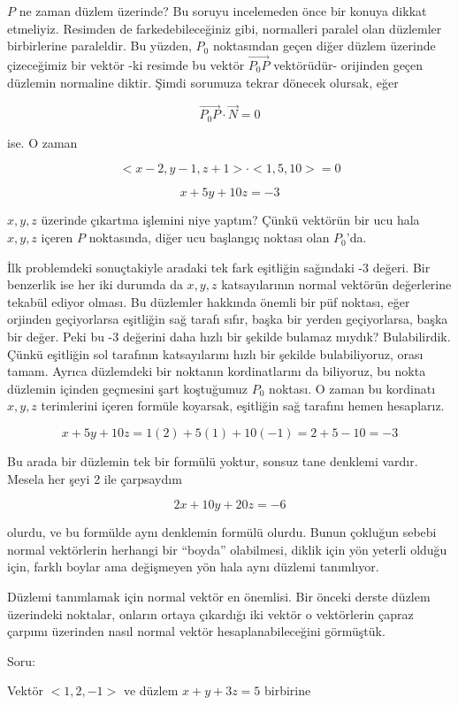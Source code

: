 \documentclass[12pt,fleqn]{article}\usepackage{../../common}
\begin{document}
$P$ ne zaman düzlem üzerinde? Bu soruyu incelemeden önce bir konuya dikkat
etmeliyiz. Resimden de farkedebileceğiniz gibi, normalleri paralel olan
düzlemler birbirlerine paraleldir. Bu yüzden, $P_0$ noktasından geçen diğer
düzlem üzerinde çizeceğimiz bir vektör -ki resimde bu vektör $\vec{P_0P}$
vektörüdür- orijinden geçen düzlemin normaline diktir. Şimdi sorumuza tekrar
dönecek olursak, eğer

$$ \vec{P_0P} \cdot \vec{N} = 0 $$

ise. O zaman 

$$ < x-2, y-1, z+1 > \cdot < 1,5,10 > = 0 $$

$$ x+5y + 10z = -3 $$

$x,y,z$ üzerinde çıkartma işlemini niye yaptım? Çünkü vektörün bir ucu hala
$x,y,z$ içeren $P$ noktasında, diğer ucu başlangıç noktası olan $P_0$'da.

İlk problemdeki sonuçtakiyle aradaki tek fark eşitliğin sağındaki -3 değeri. Bir
benzerlik ise her iki durumda da $x,y,z$ katsayılarının normal vektörün
değerlerine tekabül ediyor olması. Bu düzlemler hakkında önemli bir püf noktası,
eğer orjinden geçiyorlarsa eşitliğin sağ tarafı sıfır, başka bir yerden
geçiyorlarsa, başka bir değer. Peki bu -3 değerini daha hızlı bir şekilde
bulamaz mıydık? Bulabilirdik. Çünkü eşitliğin sol tarafının katsayılarını hızlı
bir şekilde bulabiliyoruz, orası tamam. Ayrıca düzlemdeki bir noktanın
kordinatlarını da biliyoruz, bu nokta düzlemin içinden geçmesini şart koştuğumuz
$P_0$ noktası. O zaman bu kordinatı $x,y,z$ terimlerini içeren formüle koyarsak,
eşitliğin sağ tarafını hemen hesaplarız.

$$ x+5y + 10z = 1(2) + 5(1) + 10(-1) = 2 + 5 -10 = -3$$

Bu arada bir düzlemin tek bir formülü yoktur, sonsuz tane denklemi
vardır. Mesela her şeyi 2 ile çarpsaydım

$$ 2x+10y+20z = -6 $$

olurdu, ve bu formülde aynı denklemin formülü olurdu. Bunun çokluğun sebebi
normal vektörlerin herhangi bir ``boyda'' olabilmesi, diklik için yön yeterli
olduğu için, farklı boylar ama değişmeyen yön hala aynı düzlemi tanımlıyor.

Düzlemi tanımlamak için normal vektör en önemlisi. Bir önceki derste düzlem
üzerindeki noktalar, onların ortaya çıkardığı iki vektör o vektörlerin çapraz
çarpımı üzerinden nasıl normal vektör hesaplanabileceğini görmüştük.

Soru:

Vektör $< 1,2,-1 >$ ve düzlem $x+y+3z = 5$ birbirine
\end{document}
